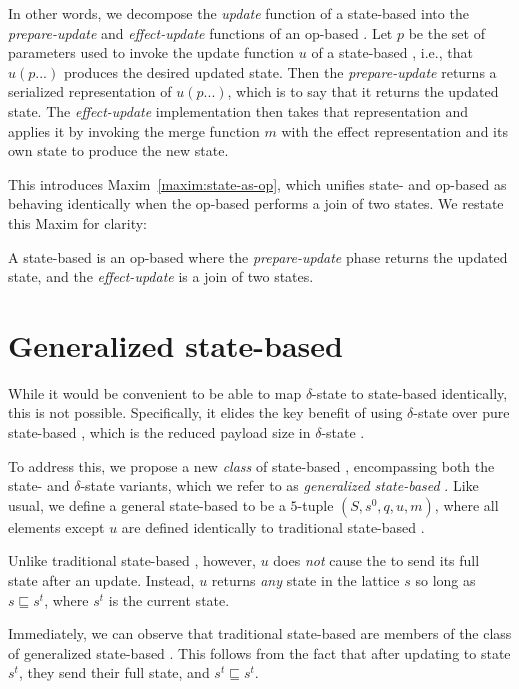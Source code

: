 In other words, we decompose the \textit{update} function of a state-based \CRDT
into the \textit{prepare-update} and \textit{effect-update} functions of an
op-based \CRDT. Let $p$ be the set of parameters used to invoke the update
function $u$ of a state-based \CRDT, i.e., that $u(p...)$ produces the desired
updated state. Then the \textit{prepare-update} returns a serialized
representation of $u(p...)$, which is to say that it returns the updated state.
The \textit{effect-update} implementation then takes that representation and
applies it by invoking the merge function $m$ with the effect representation and
its own state to produce the new state.

This introduces Maxim~\ref{maxim:state-as-op}, which unifies state- and op-based
\CRDTs as behaving identically when the op-based \CRDT performs a join of two
states. We restate this Maxim for clarity:

\setcounter{maxim}{0}
\begin{maxim}
  A state-based \CRDT is an op-based \CRDT where the \emph{prepare-update} phase
  returns the updated state, and the \emph{effect-update} is a join of two
  states.
\end{maxim}

\section{Generalized state-based \CRDTs}
While it would be convenient to be able to map $\delta$-state \CRDTs to
state-based \CRDTs identically, this is not possible. Specifically, it elides
the key benefit of using $\delta$-state \CRDTs over pure state-based \CRDTs,
which is the reduced payload size in $\delta$-state \CRDTs.

To address this, we propose a new \emph{class} of state-based \CRDTs,
encompassing both the state- and $\delta$-state variants, which we refer to as
\emph{generalized state-based \CRDTs}. Like usual, we define a general
state-based \CRDT to be a $5$-tuple $(S, s^0, q, u, m)$, where all elements
except $u$ are defined identically to traditional state-based \CRDTs.

Unlike traditional state-based \CRDTs, however, $u$ does \emph{not} cause the
\CRDT to send its full state after an update. Instead, $u$ returns \emph{any}
state in the lattice $s$ so long as $s \sqsubseteq s^t$, where $s^t$ is the
current state.

Immediately, we can observe that traditional state-based \CRDTs are members of
the class of generalized state-based \CRDTs. This follows from the fact that
after updating to state $s^t$, they send their full state, and $s^t \sqsubseteq
s^t$.

